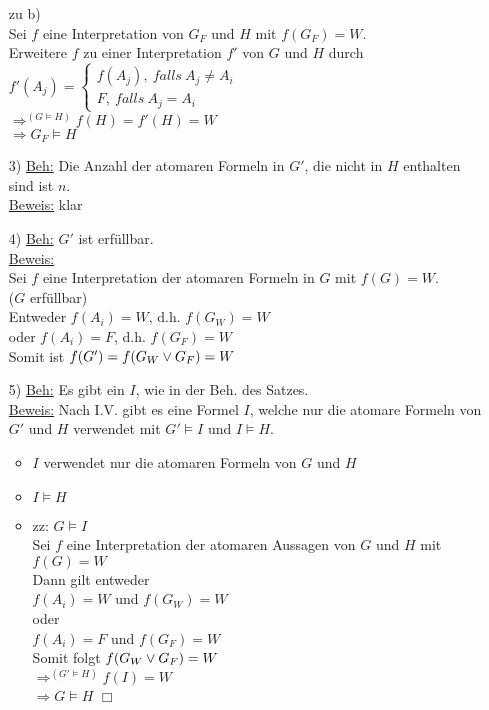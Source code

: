 \begin{enumerate}
zu b)\\
Sei $f$ eine Interpretation von $G_F$ und $H$ mit $f(G_F) = W$.\\
Erweitere $f$ zu einer Interpretation $f'$ von $G$ und $H$ durch\\
$f'(A_j) = \begin{cases} f(A_j),\ falls\ A_j \neq A_i \\ F,\ falls\ A_j = A_i \end{cases}$\\
$\Rightarrow^{(G \models H)} f(H) = f'(H) = W$\\
$\Rightarrow G_F \models H$

\item[3)] \underline{Beh:} Die Anzahl der atomaren Formeln in $G'$, die nicht in $H$ enthalten sind ist $n$.\\
\underline{Beweis:} klar

\item[4)] \underline{Beh:} $G'$ ist erfüllbar.\\
\underline{Beweis:}\\
Sei $f$ eine Interpretation der atomaren Formeln in $G$ mit $f(G) = W$.\\
($G$ erfüllbar)\\
Entweder $f(A_i) = W$, d.h. $f(G_W) = W$\\
oder $f(A_i) = F$, d.h. $f(G_F) = W$\\
Somit ist $f(G') = f(G_W \vee G_F) = W$

\item[5)] \underline{Beh:} Es gibt ein $I$, wie in der Beh. des Satzes.\\
\underline{Beweis:} Nach I.V. gibt es eine Formel $I$, welche nur die atomare Formeln von $G'$ und $H$ verwendet mit $G' \models I$ und $I \models H$.

\begin{itemize}
\item $I$ verwendet nur die atomaren Formeln von $G$ und $H$
\item $I \models H$ 
\item zz: $G \models I$\\
Sei $f$ eine Interpretation der atomaren Aussagen von $G$ und $H$ mit $f(G) = W$\\
Dann gilt entweder\\
$f(A_i) = W$ und $f(G_W) = W$\\
oder\\
$f(A_i) = F$ und $f(G_F) = W$\\
Somit folgt $f(G_W \vee G_F) = W$\\
$\Rightarrow^{(G' \models H)} f(I) = W$\\
$\Rightarrow G \models H$ $\Box$
\end{itemize}

\end{enumerate}



